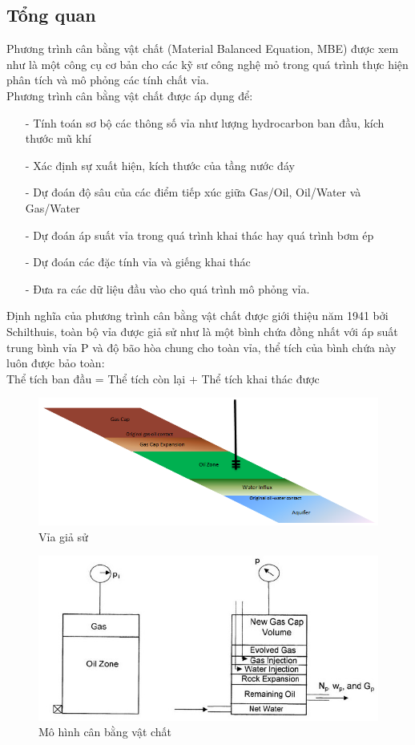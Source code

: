 \documentclass[12pt,a4paper]{report}
\begin{document}
\subsection{Tổng quan}
Phương trình cân bằng vật chất (Material Balanced Equation, MBE) được xem như là một công cụ cơ bản cho các kỹ sư công nghệ mỏ trong quá trình thực hiện phân tích và mô phỏng các tính chất vỉa.\\
Phương trình cân bằng vật chất được áp dụng để:
	\begin{itemize}
    	\item[-] Tính toán sơ bộ các thông số vỉa như lượng hydrocarbon ban đầu, kích thước mũ khí
        \item[-] Xác định sự xuất hiện, kích thước của tầng nước đáy
        \item[-] Dự đoán độ sâu của các điểm tiếp xúc giữa Gas/Oil, Oil/Water và Gas/Water
        \item[-] Dự đoán áp suất vỉa trong quá trình khai thác hay quá trình bơm ép
        \item[-] Dự đoán các đặc tính vỉa và giếng khai thác
        \item[-] Đưa ra các dữ liệu đầu vào cho quá trình mô phỏng vỉa.
    \end{itemize}
    Định nghĩa của phương trình cân bằng vật chất được giới thiệu năm 1941 bởi Schilthuis, toàn bộ vỉa được giả sử như là một bình chứa đồng nhất với áp suất trung bình vỉa P và độ bão hòa chung cho toàn vỉa, thể tích của bình chứa này luôn được bảo toàn:\\
    \hspace*{1.5cm}Thể tích ban đầu = Thể tích còn lại + Thể tích khai thác được\\
    \begin{figure}[h]
    	\centering
        \includegraphics[scale=.7]{Fig/tank_reservoir.PNG}
        \caption{Vỉa giả sử}
    \end{figure}
	\begin{figure}[h]
    	\centering
        \includegraphics[scale=0.7]{Fig/tank_model.jpg}
        \caption{Mô hình cân bằng vật chất}
    \end{figure}
\end{document}
